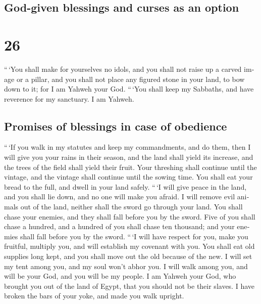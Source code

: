 \begin{paracol}{2}
\switchcolumn
\begin{otherlanguage}{english}

\hypertarget{god-given-blessings-and-curses-as-an-option}{%
\subsection{God-given blessings and curses as an
option}\label{god-given-blessings-and-curses-as-an-option}}

\hypertarget{section-51}{%
\section{26}\label{section-51}}

 ``\,`You shall make for yourselves no idols, and you
shall not raise up a carved image or a pillar, and you shall not place
any figured stone in your land, to bow down to it; for I am Yahweh your
God.  ``\,`You shall keep my Sabbaths, and have reverence
for my sanctuary. I am Yahweh.

\hypertarget{promises-of-blessings-in-case-of-obedience}{%
\subsection{Promises of blessings in case of
obedience}\label{promises-of-blessings-in-case-of-obedience}}

 ``\,`If you walk in my statutes and keep my commandments,
and do them,  then I will give you your rains in their
season, and the land shall yield its increase, and the trees of the
field shall yield their fruit.  Your threshing shall
continue until the vintage, and the vintage shall continue until the
sowing time. You shall eat your bread to the full, and dwell in your
land safely.  ``\,`I will give peace in the land, and you
shall lie down, and no one will make you afraid. I will remove evil
animals out of the land, neither shall the sword go through your land.
 You shall chase your enemies, and they shall fall before
you by the sword.  Five of you shall chase a hundred, and
a hundred of you shall chase ten thousand; and your enemies shall fall
before you by the sword.  ``\,`I will have respect for
you, make you fruitful, multiply you, and will establish my covenant
with you.  You shall eat old supplies long kept, and you
shall move out the old because of the new.  I will set my
tent among you, and my soul won't abhor you.  I will walk
among you, and will be your God, and you will be my people.
 I am Yahweh your God, who brought you out of the land of
Egypt, that you should not be their slaves. I have broken the bars of
your yoke, and made you walk upright.


\end{otherlanguage}
\end{paracol}
